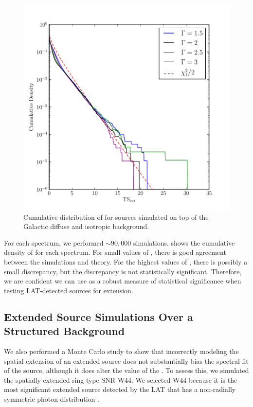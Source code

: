 \begin{figure}[htbp]
  \includegraphics{chapters/extended_analysis/figures/mc_plots/plot_tsext_plane_color.pdf}
  \caption{Cumulative distribution of \tsext for sources simulated on
  top of the Galactic diffuse and isotropic background.}
\end{figure}

For each spectrum, we performed $\sim90,000$ simulations.
 shows the cumulative density of \tsext for each
spectrum. For small values of \tsext, there is good agreement between
the simulations and theory.  For the highest values of \tsext, there is
possibly a small discrepancy, but the discrepancy is not statistically
significant.  Therefore, we are confident we can use \tsext as a robust
measure of statistical significance when testing LAT-detected sources
for extension.

\subsection{Extended Source Simulations Over a Structured Background}

We also performed a Monte Carlo study to show that incorrectly modeling
the spatial extension of an extended source does not substantially bias
the spectral fit of the source, although it does alter the value of
the \ts.  To assess this, we simulated the spatially extended ring-type
SNR W44.  We selected W44 because it is the most significant extended
source detected by the LAT that has a non-radially symmetric photon
distribution \citep{abdo_2010a_gamma-ray-emission}.

